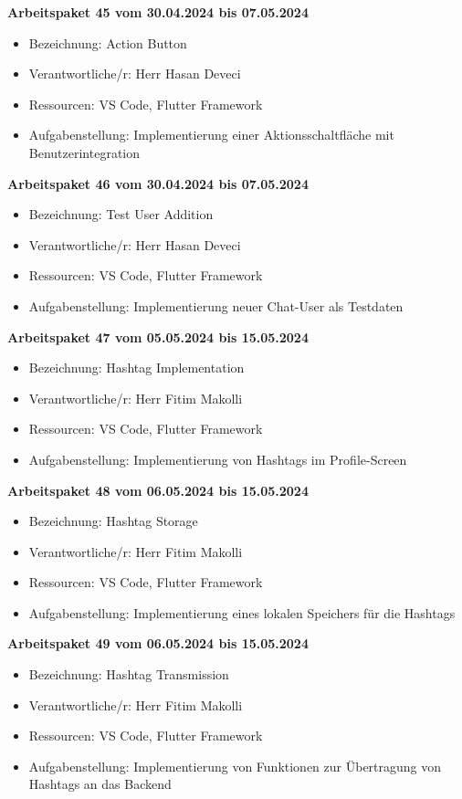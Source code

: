 \textbf{Arbeitspaket 45 vom 30.04.2024 bis 07.05.2024}
\begin{itemize}[itemsep=0pt]
    \item{Bezeichnung: Action Button} 
	\item{Verantwortliche/r: Herr Hasan Deveci} 
	\item{Ressourcen: VS Code, Flutter Framework} 
    \item{Aufgabenstellung: Implementierung einer Aktionsschaltfläche mit Benutzerintegration}
\end{itemize} 

\textbf{Arbeitspaket 46 vom 30.04.2024 bis 07.05.2024}
\begin{itemize}[itemsep=0pt]
    \item{Bezeichnung: Test User Addition} 
	\item{Verantwortliche/r: Herr Hasan Deveci} 
	\item{Ressourcen: VS Code, Flutter Framework} 
    \item{Aufgabenstellung: Implementierung neuer Chat-User als Testdaten}
\end{itemize} 

\textbf{Arbeitspaket 47 vom 05.05.2024 bis 15.05.2024}
\begin{itemize}[itemsep=0pt]
    \item{Bezeichnung: Hashtag Implementation} 
	\item{Verantwortliche/r: Herr Fitim Makolli} 
	\item{Ressourcen: VS Code, Flutter Framework} 
    \item{Aufgabenstellung: Implementierung von Hashtags im Profile-Screen}
\end{itemize} 

\textbf{Arbeitspaket 48 vom 06.05.2024 bis 15.05.2024}
\begin{itemize}[itemsep=0pt]
    \item{Bezeichnung: Hashtag Storage} 
	\item{Verantwortliche/r: Herr Fitim Makolli} 
	\item{Ressourcen: VS Code, Flutter Framework} 
    \item{Aufgabenstellung: Implementierung eines lokalen Speichers für die Hashtags}
\end{itemize} 

\textbf{Arbeitspaket 49 vom 06.05.2024 bis 15.05.2024}
\begin{itemize}[itemsep=0pt]
    \item{Bezeichnung: Hashtag Transmission} 
	\item{Verantwortliche/r: Herr Fitim Makolli} 
	\item{Ressourcen: VS Code, Flutter Framework} 
    \item{Aufgabenstellung: Implementierung von Funktionen zur Übertragung von Hashtags an das Backend}
\end{itemize} 

